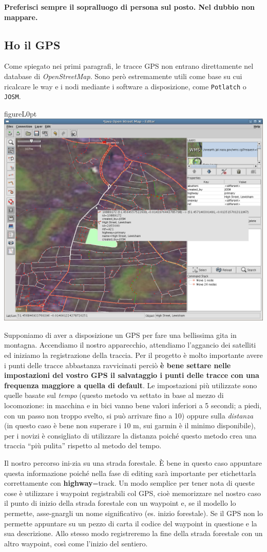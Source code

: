 \documentclass[a4paper,twoside,12pt,]{article}
\newcommand{\osm}{\emph{OpenStreetMap}\xspace}
\newcommand{\gps}{GPS\xspace}
\newcommand{\key}[1]{\textsf{\textbf{#1}}}
\newcommand{\val}[1]{\textsf{#1}}
\newcommand{\soft}[1]{\texttt{#1}}
\begin{document}
\textbf{Preferisci sempre il sopralluogo di persona sul posto. Nel dubbio non mappare.}
\subsection{Ho il \gps}
Come spiegato nei primi paragrafi, le tracce \gps non entrano direttamente nel database di \osm. Sono però estremamente utili come base su cui ricalcare le way e i nodi mediante i software a disposizione, come \soft{Potlatch} o \soft{JOSM}.
\begin{wrapfloat}{figure}{L}{0pt}
 \includegraphics[width=0.6\columnwidth]{Josm-screenshot.png}
 \caption{\textit{L'interfaccia di JOSM}}
\end{wrapfloat}
Supponiamo di aver a disposizione un \gps per fare una bellissima gita in montagna. Accendiamo il nostro apparecchio, attendiamo l'aggancio dei satelliti ed iniziamo la registrazione della traccia. Per il progetto è molto importante avere i punti delle tracce abbastanza ravvicinati perciò \textbf{è bene settare nelle impostazioni del vostro \gps il salvataggio i punti delle tracce con una frequenza maggiore a quella di default}. Le impostazioni più utilizzate sono quelle basate sul \textit{tempo} (questo metodo va settato in base al mezzo di locomozione: in macchina e in bici vanno bene valori inferiori a 5 secondi; a piedi, con un passo non troppo svelto, si può arrivare fino a 10) oppure sulla \textit{distanza} (in questo caso è bene non superare i 10 m, sui garmin è il minimo disponibile), per i novizi è consigliato di utilizzare la distanza poiché questo metodo crea una traccia ``più pulita'' rispetto al metodo del tempo.

Il nostro percorso ini-zia su una strada forestale. È bene in questo caso appuntare questa informazione poiché nella fase di editing sarà importante per etichettarla correttamente con \key{highway}=\val{track}. Un modo semplice per tener nota di queste cose è utilizzare i waypoint registrabili col \gps, cioè memorizzare nel nostro caso il punto di inizio della strada forestale con un waypoint e, se il modello lo permette, asse-gnargli un nome significativo (es. inizio forestale). Se il \gps non lo permette appuntare su un pezzo di carta il codice del waypoint in questione e la sua descrizione. Allo stesso modo registreremo la fine della strada forestale con un altro waypoint, così come l'inizio del sentiero.
\end{document}
